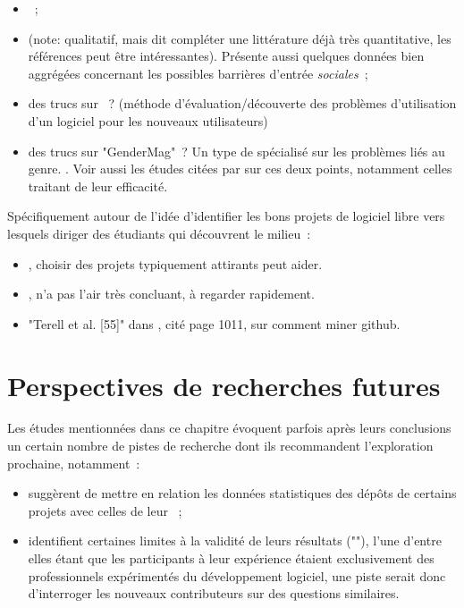 \begin{itemize}
    \item {} ;
    \item {} (note: qualitatif, mais dit compléter une littérature déjà très
        quantitative, les références peut être intéressantes). Présente aussi quelques données bien aggrégées
        concernant les possibles barrières d'entrée \emph{sociales} ;
    \item des trucs sur  ? (méthode  d'évaluation/découverte des
        problèmes d'utilisation d'un logiciel pour les nouveaux utilisateurs)
    \item des trucs sur "GenderMag" ? Un type de  spécialisé sur les problèmes liés
        au genre. . Voir aussi les études citées par
        \textcite[p.~1005-1006]{barriers-2018} sur ces deux points, notamment celles traitant de leur
        efficacité.
\end{itemize}

Spécifiquement autour de l'idée d'identifier les bons projets de logiciel libre vers lesquels diriger des
étudiants qui découvrent le milieu :

\begin{itemize}
    \item {}, choisir des projets typiquement attirants peut aider.
    \item {}, n'a pas l'air très concluant, à regarder rapidement.
    \item "Terell et al. [55]" dans \textcite{barriers-2018}, cité page 1011, sur comment miner github.
\end{itemize}

\section{Perspectives de recherches futures}

Les études mentionnées dans ce chapitre évoquent parfois après leurs conclusions un certain nombre de pistes
de recherche dont ils recommandent l'exploration prochaine, notamment :

\begin{itemize}
    \item \textcite[p.~14]{contribution-patterns-2010} suggèrent de mettre en relation les données
        statistiques des \glspl{dépôt} de certains projets avec celles de leur  ;
    \item \textcite[p.~1013]{barriers-2018} identifient certaines limites à la validité de leurs résultats
        (""), l'une d'entre elles étant que les participants à leur expérience
         étaient exclusivement des professionnels expérimentés du développement logiciel, une
        piste serait donc d'interroger les nouveaux contributeurs sur des questions similaires.
\end{itemize}

